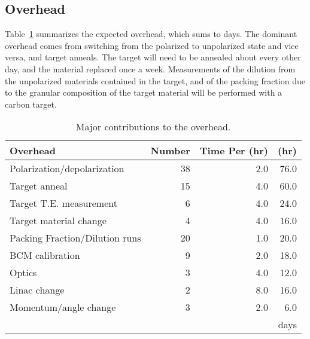 \subsection{Overhead}

Table~\ref{OVERHEAD} summarizes the expected overhead, which sums to \overheaddays days.
The dominant overhead comes from switching from the polarized to unpolarized state and vice versa, and target anneals.  The target will need to be annealed about every other day, and the material replaced once a week.
Measurements of the dilution from the unpolarized materials contained in the target, and of the packing fraction due to the granular composition of the target material will be performed with a carbon target.


\begin{table}
\begin{center}
  \begin{tabular}{lrrr} \hline\hline
 Overhead & Number&Time Per (hr)&(hr)\\
\hline
Polarization/depolarization 		& 38 & 2.0 & 76.0\\
Target anneal             		& 15 & 4.0 & 60.0\\
Target T.E. measurement   		&  6 & 4.0 & 24.0\\
Target material change    		&  4 & 4.0 & 16.0\\
Packing Fraction/Dilution runs 	& 20 & 1.0 & 20.0\\
\hline
BCM calibration           		&  9 & 2.0 & 18.0\\
Optics                    		&  3 & 4.0 & 12.0\\
Linac change              		&  2 & 8.0 & 16.0\\
Momentum/angle change     		&  3 & 2.0 &  6.0\\
\hline
                          		&    &     & \overheaddays days  \\
\hline
 \end{tabular}
 \end{center}
  \caption{\label{OVERHEAD} Major contributions to the overhead.}
\end{table}

